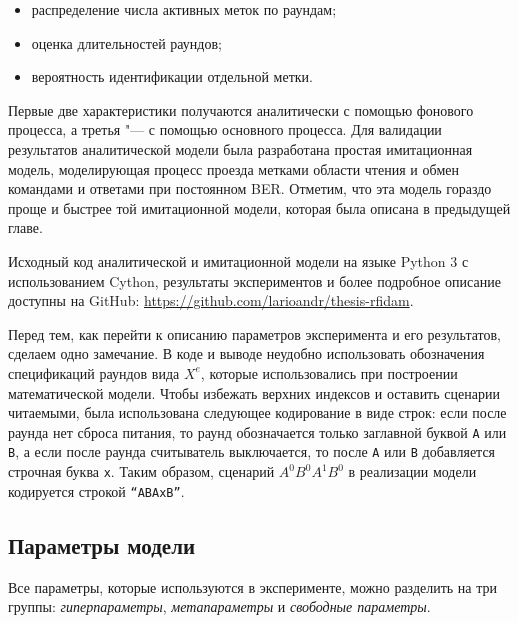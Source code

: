 \begin{itemize}
	\item{распределение числа активных меток по раундам;}
	\item{оценка длительностей раундов;}
	\item{вероятность идентификации отдельной метки.}
\end{itemize}
Первые две характеристики получаются аналитически с помощью фонового процесса, а третья "--- с помощью основного процесса. Для валидации результатов аналитической модели была разработана простая имитационная модель, моделирующая процесс проезда метками области чтения и обмен командами и ответами при постоянном BER. Отметим, что эта модель гораздо проще и быстрее той имитационной модели, которая была описана в предыдущей главе.

Исходный код аналитической и имитационной модели на языке Python 3 с использованием Cython, результаты экспериментов и более подробное описание доступны на GitHub: \url{https://github.com/larioandr/thesis-rfidam}.

Перед тем, как перейти к описанию параметров эксперимента и его результатов, сделаем одно замечание. В коде и выводе неудобно использовать обозначения спецификаций раундов вида $X^e$, которые использовались при построении математической модели. Чтобы избежать верхних индексов и оставить сценарии читаемыми, была использована следующее кодирование в виде строк: если после раунда нет сброса питания, то раунд обозначается только заглавной буквой \texttt{A} или \texttt{B}, а если после раунда считыватель выключается, то после \texttt{A} или \texttt{B} добавляется строчная буква \texttt{x}. Таким образом, сценарий $A^0B^0A^1B^0$ в реализации модели кодируется строкой \texttt{``ABAxB''}.

\subsection{Параметры модели}\label{subsec:ch3_results_params}

Все параметры, которые используются в эксперименте, можно разделить на три группы: \textit{гиперпараметры}, \textit{метапараметры} и \textit{свободные параметры}.

